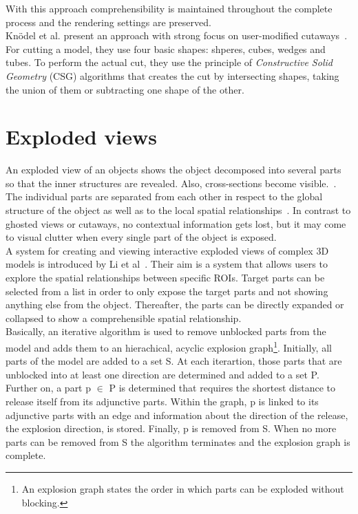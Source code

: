 With this approach comprehensibility is maintained throughout the complete process and the rendering settings are preserved.\\
\newline
Kn{\"o}del et al. present an approach with strong focus on user-modified cutaways~\cite{incoll:cutawayIllustration}. For cutting a model, they use four basic shapes: shperes, cubes, wedges and tubes. To perform the actual cut, they use the principle of \emph{Constructive Solid Geometry} (CSG) algorithms that creates the cut by intersecting shapes, taking the union of them or subtracting one shape of the other.\\

\section{Exploded views}
An exploded view of an objects shows the object decomposed into several parts so that the inner structures are revealed. Also, cross-sections become visible.~\cite{jour:explodedView}. The individual parts are separated from each other in respect to the global structure of the object as well as to the local spatial relationships~\cite{jour:generationExplodedView}. In contrast to ghosted views or cutaways, no contextual information gets lost, but it may come to visual clutter when every single part of the object is exposed.\\
\newline
A system for creating and viewing interactive exploded views of complex 3D models is introduced by Li et al~\cite{jour:generationExplodedView}. Their aim is a system that allows users to explore the spatial relationships between specific ROIs. Target parts can be selected from a list in order to only expose the target parts and not showing anything else from the object. Thereafter, the parts can be directly expanded or collapsed to show a comprehensible spatial relationship.\\
Basically, an iterative algorithm is used to remove unblocked parts from the model and adds them to an hierachical, acyclic explosion graph\footnote{An explosion graph states the order in which parts can be exploded without blocking.}. Initially, all parts of the model are added to a set S. At each iterartion, those parts that are unblocked into at least one direction are determined and added to a set P. Further on, a part p $\in$ P is determined that requires the shortest distance to release itself from its adjunctive parts. Within the graph, p is linked to its adjunctive parts with an edge and information about the direction of the release, the explosion direction, is stored. Finally, p is removed from S. When no more parts can be removed from S the algorithm terminates and the explosion graph is complete.\\
